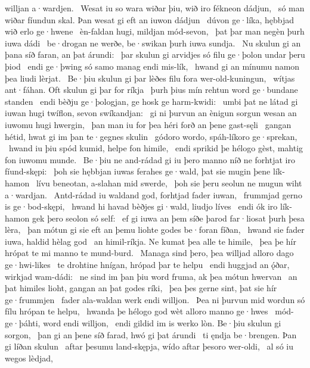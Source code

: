 willjan a·wardjen. \hld\ Wesat iu so wara wiðar þiu,
wið iro fékneon dádjun, \hld\ só man wiðar fíundun skal.
Þan wesat gi eft an iuwon dádjun \hld\ dúvon ge·líka,
hębbjad wið erlo ge·hwene \hld\ èn-faldan hugi,
mildjan mód-sevon, \hld\ þat þar man negèn
þurh iuwa dádi \hld\ be·drogan ne werðe,
be·swikan þurh iuwa sundja. \hld\ Nu skulun gi an þana síð faran,
an þat árundi: \hld\ þar skulun gi arvidjes só filu
ge·þolon undar þeru þiod \hld\ endi ge·þwing só samo
manag endi mis-lík, \hld\ hwand gi an mínumu namon
þea liudi lèrjat. \hld\ Be·þiu skulun gi þar lèðes filu
fora wer-old-kuningun, \hld\ wítjas ant·fáhan.
Oft skulun gi þar for ríkja \hld\ þurh þius mín rehtun word
ge·bundane standen \hld\ endi bèðju ge·þologjan,
ge hosk ge harm-kwidi: \hld\ umbi þat ne látad gi iuwan hugi twíflon,
sevon swíkandjan: \hld\ gi ni þurvun an ènigun sorgun wesan
an iuwomu hugi hwergin, \hld\ þan man iu for þea héri forð
an þene gast-sęli \hld\ gangan hétid,
hwat gi im þan te·gegnes skulin \hld\ gódoro wordo,
spáh-líkoro ge·sprekan, \hld\ hwand iu þiu spód kumid,
helpe fon himile, \hld\ endi sprikid þe hélogo gèst,
mahtig fon iuwomu munde. \hld\ Be·þiu ne and-rádad gi iu þero manno níð
ne forhtjat iro fíund-skępi: \hld\ þoh sie hębbjan iuwas ferahes ge·wald,
þat sie mugin þene lík-hamon \hld\ lívu beneotan,
a-slahan mid swerde, \hld\ þoh sie þeru seolun ne mugun
wiht a·wardjan. \hld\ Antd-rádad iu waldand god,
forhtjad fader iuwan, \hld\ frummjad gerno
is ge·bod-skępi, \hld\ hwand hi havad bèðjes gi·wald,
liudjo líves \hld\ endi ók iro lík-hamon
gek þero seolon só self: \hld\ ef gi iuwa an þem síðe þarod
far·liosat þurh þesa lèra, \hld\ þan mótun gi sie eft an þemu liohte godes
be·foran fíðan, \hld\ hwand sie fader iuwa,
haldid hèlag god \hld\ an himil-ríkja.
Ne kumat þea alle te himile, \hld\ þea þe hír hrópat te mi
manno te mund-burd. \hld\ Managa sind þero,
þea willjad alloro dago ge·hwi-likes \hld\ te drohtine hnígan,
hrópad þar te helpu \hld\ endi huggjad an ǫ́ðar,
wirkjad wam-dádi: \hld\ ne sind im þan þiu word fruma,
ak þea mótun hwervan \hld\ an þat himiles lioht,
gangan an þat godes ríki, \hld\ þea þes gerne sint,
þat sie hír ge·frummjen \hld\ fader ala-waldan
werk endi willjon. \hld\ Þea ni þurvun mid wordun só fílu
hrópan te helpu, \hld\ hwanda þe hélogo god
wèt alloro manno ge·hwes \hld\ mód-ge·þáhti,
word endi willjon, \hld\ endi gildid im is werko lòn.
Be·þiu skulun gi sorgon, \hld\ þan gi an þene síð farad,
hwó gi þat árundi \hld\ ti ęndja be·brengen.
Þan gi líðan skulun \hld\ aftar þesumu land-skępja,
wído aftar þesoro wer-oldi, \hld\ al só iu wegos lèdjad,
